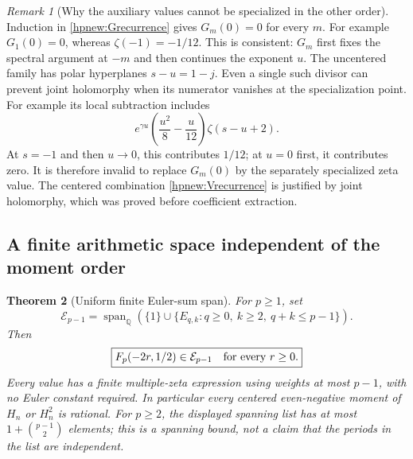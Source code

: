 \documentclass[11pt,a4paper]{article}
\numberwithin{equation}{section}
\newtheorem{theorem}{Theorem}[section]
\theoremstyle{definition}
\theoremstyle{remark}
\newtheorem{remark}[theorem]{Remark}
\begin{document}
\begin{remark}[Why the auxiliary values cannot be specialized in the other order]
\label{hpnew:orderwarning}
Induction in \eqref{hpnew:Grecurrence} gives $G_m(0)=0$ for every
$m$. For example $G_1(0)=0$, whereas $\zeta(-1)=-1/12$.
This is consistent: $G_m$ first fixes the spectral argument at $-m$
and then continues the exponent $u$. The uncentered family has polar hyperplanes $s-u=1-j$.
Even a single such divisor can prevent joint holomorphy when its
numerator vanishes at the specialization point. For example its
local subtraction includes
\[
 e^{\gamma u}\left(\frac{u^2}{8}-\frac{u}{12}\right)
                                      \zeta(s-u+2).
\]
At $s=-1$ and then $u\to0$, this contributes $1/12$; at $u=0$
first, it contributes zero. It is therefore invalid to replace
$G_m(0)$ by the separately specialized zeta value.
The centered combination \eqref{hpnew:Vrecurrence} is justified by
joint holomorphy, which was proved before coefficient extraction.
\end{remark}

\subsection{A finite arithmetic space independent of the moment order}

\begin{theorem}[Uniform finite Euler-sum span]
\label{hpnew:uniformspan}
For $p\ge1$, set
\begin{equation}\label{hpnew:space}
 \mathcal E_{p-1}=\operatorname{span}_{\mathbb Q}
 \left(\{1\}\cup
   \{E_{q,k}:q\ge0,\ k\ge2,\ q+k\le p-1\}\right).
\end{equation}
Then
\begin{equation}\label{hpnew:spanconclusion}
 \boxed{\displaystyle
             F_p(-2r,1/2)\in\mathcal E_{p-1}
                    \quad\hbox{for every }r\ge0.}
\end{equation}
Every value has a finite multiple-zeta expression using weights at
most $p-1$, with no Euler constant required. In particular every
centered even-negative moment of $H_n$ or $H_n^2$ is rational.
For $p\ge2$, the displayed spanning list has at most
$1+\binom{p-1}{2}$ elements; this is a spanning bound, not a claim
that the periods in the list are independent.
\end{theorem}
\end{document}
